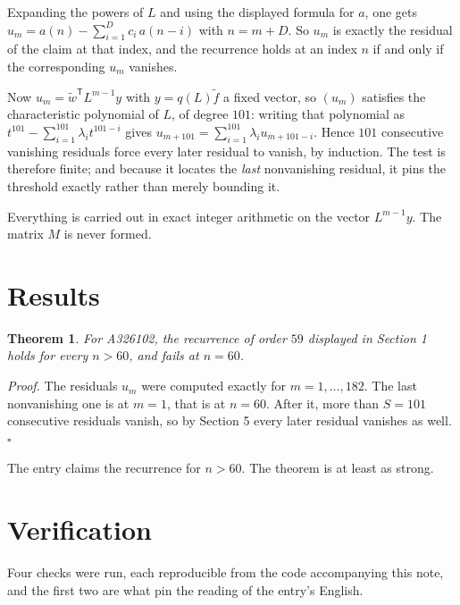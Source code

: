 \documentclass[11pt]{article}
\newtheorem{theorem}{Theorem}
\theoremstyle{definition}
\begin{document}
Expanding the powers of $L$ and using the displayed formula for $a$, one gets $u_m = a(n) - \sum_{i=1}^{D} c_i\,a(n-i)$ with $n = m + D$. So $u_m$ is exactly the residual of the claim at that index, and the recurrence holds at an index $n$ if and only if the corresponding $u_m$ vanishes.

Now $u_m = \tilde w^{\mathsf T} L^{m-1} y$ with $y = q(L)\tilde f$ a fixed vector, so $(u_m)$ satisfies the characteristic polynomial of $L$, of degree $101$: writing that polynomial as $t^{101} - \sum_{i=1}^{101} \lambda_i t^{101-i}$ gives $u_{m+101} = \sum_{i=1}^{101} \lambda_i u_{m+101-i}$. Hence $101$ consecutive vanishing residuals force every later residual to vanish, by induction. The test is therefore finite; and because it locates the {\itshape last} nonvanishing residual, it pins the threshold exactly rather than merely bounding it.

Everything is carried out in exact integer arithmetic on the vector $L^{m-1}y$. The matrix $M$ is never formed.

\section{Results}

\begin{theorem} For A326102, the recurrence of order $59$ displayed in Section 1 holds for every $n > 60$, and fails at $n = 60$.\end{theorem}

{\itshape Proof.} The residuals $u_m$ were computed exactly for $m = 1,\dots,182$. The last nonvanishing one is at $m = 1$, that is at $n = 60$. After it, more than $S = 101$ consecutive residuals vanish, so by Section 5 every later residual vanishes as well. $\square$

The entry claims the recurrence for $n > 60$. The theorem is at least as strong.

\section{Verification}

Four checks were run, each reproducible from the code accompanying this note, and the first two are what pin the reading of the entry's English.
\end{document}
